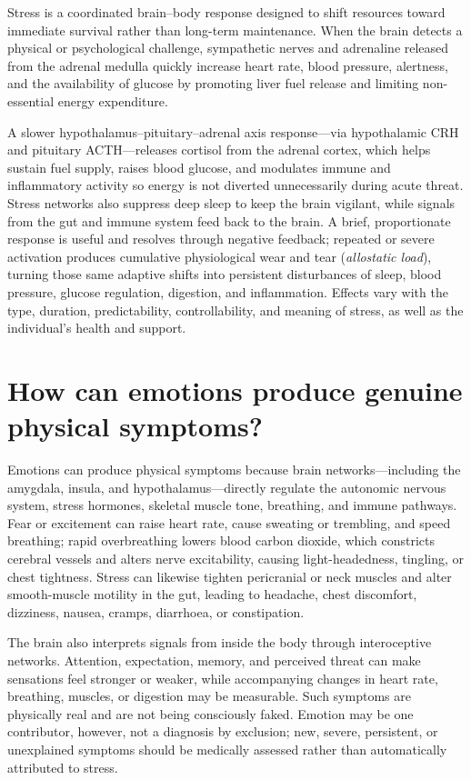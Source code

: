 \documentclass[11pt,oneside]{report}
\begin{document}
Stress is a coordinated brain--body response designed to shift resources toward
immediate survival rather than long-term maintenance. When the brain detects a
physical or psychological challenge, sympathetic nerves and adrenaline released
from the adrenal medulla quickly increase heart rate, blood pressure,
alertness, and the availability of glucose by promoting liver fuel release and
limiting non-essential energy expenditure.

A slower hypothalamus--pituitary--adrenal axis response—via hypothalamic CRH and
pituitary ACTH—releases cortisol from the adrenal cortex, which
helps sustain fuel supply, raises blood glucose, and modulates immune and
inflammatory activity so energy is not diverted unnecessarily during acute
threat. Stress networks also suppress deep sleep to keep the brain vigilant,
while signals from the gut and immune system feed back to the brain. A brief,
proportionate response is useful and resolves through negative feedback;
repeated or severe activation produces cumulative physiological wear and tear
(\emph{allostatic load}), turning those same adaptive shifts into persistent
disturbances of sleep, blood pressure, glucose regulation, digestion, and
inflammation. Effects vary with the type, duration,
predictability, controllability, and meaning of stress, as well as the
individual's health and support.

\section{How can emotions produce genuine physical symptoms?}

Emotions can produce physical symptoms because brain networks---including the
amygdala, insula, and hypothalamus---directly regulate the autonomic nervous
system, stress hormones, skeletal muscle tone, breathing, and immune pathways.
Fear or excitement can raise heart rate, cause sweating or trembling, and speed
breathing; rapid overbreathing lowers blood carbon dioxide, which constricts
cerebral vessels and alters nerve excitability, causing light-headedness,
tingling, or chest tightness. Stress can likewise tighten pericranial or neck
muscles and alter smooth-muscle motility in the gut, leading to headache, chest
discomfort, dizziness, nausea, cramps, diarrhoea, or constipation.

The brain also interprets signals from inside the body through interoceptive
networks. Attention, expectation, memory, and perceived threat can make
sensations feel stronger or weaker, while accompanying changes in heart rate,
breathing, muscles, or digestion may be measurable. Such symptoms are
physically real and are not being consciously faked. Emotion may be one
contributor, however, not a diagnosis by exclusion; new, severe, persistent,
or unexplained symptoms should be medically assessed rather than automatically
attributed to stress.
\end{document}
